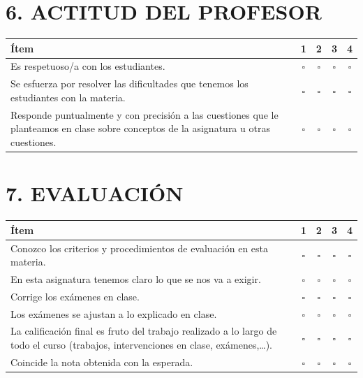 \documentclass[12pt,a4paper]{article}
\begin{document}
\section*{6. ACTITUD DEL PROFESOR}

\begin{tabularx}{\textwidth}{Xcccc}
\toprule
\rowcolor{headerblue}
\textbf{Ítem} & \textbf{1} & \textbf{2} & \textbf{3} & \textbf{4} \\
\midrule
Es respetuoso/a con los estudiantes. & $\square$ & $\square$ & $\square$ & $\square$ \\[6pt]
Se esfuerza por resolver las dificultades que tenemos los estudiantes con la materia. & $\square$ & $\square$ & $\square$ & $\square$ \\[6pt]
Responde puntualmente y con precisión a las cuestiones que le planteamos en clase sobre conceptos de la asignatura u otras cuestiones. & $\square$ & $\square$ & $\square$ & $\square$ \\
\bottomrule
\end{tabularx}

\vspace{1em}

\section*{7. EVALUACIÓN}

\begin{tabularx}{\textwidth}{Xcccc}
\toprule
\rowcolor{headerblue}
\textbf{Ítem} & \textbf{1} & \textbf{2} & \textbf{3} & \textbf{4} \\
\midrule
Conozco los criterios y procedimientos de evaluación en esta materia. & $\square$ & $\square$ & $\square$ & $\square$ \\[6pt]
En esta asignatura tenemos claro lo que se nos va a exigir. & $\square$ & $\square$ & $\square$ & $\square$ \\[6pt]
Corrige los exámenes en clase. & $\square$ & $\square$ & $\square$ & $\square$ \\[6pt]
Los exámenes se ajustan a lo explicado en clase. & $\square$ & $\square$ & $\square$ & $\square$ \\[6pt]
La calificación final es fruto del trabajo realizado a lo largo de todo el curso (trabajos, intervenciones en clase, exámenes,\ldots). & $\square$ & $\square$ & $\square$ & $\square$ \\[6pt]
Coincide la nota obtenida con la esperada. & $\square$ & $\square$ & $\square$ & $\square$ \\
\bottomrule
\end{tabularx}
\end{document}
